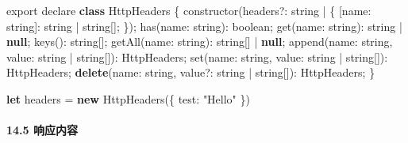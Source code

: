 \documentclass[
]{article}
\newenvironment{Shaded}{}{}
\newcommand{\DataTypeTok}[1]{\textcolor[rgb]{0.56,0.13,0.00}{#1}}
\newcommand{\FunctionTok}[1]{\textcolor[rgb]{0.02,0.16,0.49}{#1}}
\newcommand{\ImportTok}[1]{#1}
\newcommand{\KeywordTok}[1]{\textcolor[rgb]{0.00,0.44,0.13}{\textbf{#1}}}
\newcommand{\NormalTok}[1]{#1}
\newcommand{\OperatorTok}[1]{\textcolor[rgb]{0.40,0.40,0.40}{#1}}
\newcommand{\StringTok}[1]{\textcolor[rgb]{0.25,0.44,0.63}{#1}}
\begin{document}
\begin{Shaded}
\begin{Highlighting}[]
\ImportTok{export}\NormalTok{ declare }\KeywordTok{class}\NormalTok{ HttpHeaders \{}
    \FunctionTok{constructor}\NormalTok{(headers}\OperatorTok{?:}\NormalTok{ string }\OperatorTok{|}\NormalTok{ \{}
\NormalTok{        [}\DataTypeTok{name}\OperatorTok{:}\NormalTok{ string]}\OperatorTok{:}\NormalTok{ string }\OperatorTok{|}\NormalTok{ string[]}\OperatorTok{;}
\NormalTok{    \})}\OperatorTok{;}
    \FunctionTok{has}\NormalTok{(}\DataTypeTok{name}\OperatorTok{:}\NormalTok{ string)}\OperatorTok{:}\NormalTok{ boolean}\OperatorTok{;}
    \FunctionTok{get}\NormalTok{(}\DataTypeTok{name}\OperatorTok{:}\NormalTok{ string)}\OperatorTok{:}\NormalTok{ string }\OperatorTok{|} \KeywordTok{null}\OperatorTok{;}
    \FunctionTok{keys}\NormalTok{()}\OperatorTok{:}\NormalTok{ string[]}\OperatorTok{;}
    \FunctionTok{getAll}\NormalTok{(}\DataTypeTok{name}\OperatorTok{:}\NormalTok{ string)}\OperatorTok{:}\NormalTok{ string[] }\OperatorTok{|} \KeywordTok{null}\OperatorTok{;}
    \FunctionTok{append}\NormalTok{(}\DataTypeTok{name}\OperatorTok{:}\NormalTok{ string}\OperatorTok{,} \DataTypeTok{value}\OperatorTok{:}\NormalTok{ string }\OperatorTok{|}\NormalTok{ string[])}\OperatorTok{:}\NormalTok{ HttpHeaders}\OperatorTok{;}
    \FunctionTok{set}\NormalTok{(}\DataTypeTok{name}\OperatorTok{:}\NormalTok{ string}\OperatorTok{,} \DataTypeTok{value}\OperatorTok{:}\NormalTok{ string }\OperatorTok{|}\NormalTok{ string[])}\OperatorTok{:}\NormalTok{ HttpHeaders}\OperatorTok{;}
    \KeywordTok{delete}\NormalTok{(}\DataTypeTok{name}\OperatorTok{:}\NormalTok{ string}\OperatorTok{,}\NormalTok{ value}\OperatorTok{?:}\NormalTok{ string }\OperatorTok{|}\NormalTok{ string[])}\OperatorTok{:}\NormalTok{ HttpHeaders}\OperatorTok{;}
\NormalTok{\}}
\end{Highlighting}
\end{Shaded}

\begin{Shaded}
\begin{Highlighting}[]
\KeywordTok{let}\NormalTok{ headers }\OperatorTok{=} \KeywordTok{new} \FunctionTok{HttpHeaders}\NormalTok{(\{ }\DataTypeTok{test}\OperatorTok{:} \StringTok{"Hello"}\NormalTok{ \})}
\end{Highlighting}
\end{Shaded}

\hypertarget{145-ux54cdux5e94ux5185ux5bb9}{%
\paragraph{14.5 响应内容}\label{145-ux54cdux5e94ux5185ux5bb9}}
\end{document}

